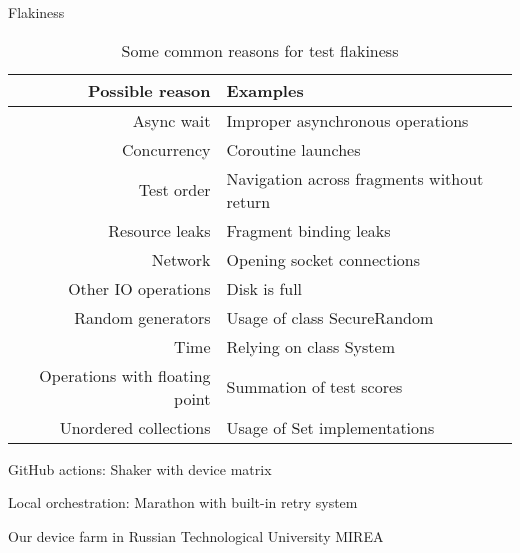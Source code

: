 \documentclass{beamer}%
\begin{document}
\begin{frame}{Flakiness}
\begin{changemargin}
\footnotesize


\begin{table}[h]
\caption{Some common reasons for test flakiness}
\centering\begin{tabular}{rl}
\toprule
Possible reason                & Examples                                   \\
\midrule
Async wait                     & Improper asynchronous operations           \\
Concurrency                    & Coroutine launches                         \\
Test order                     & Navigation across fragments without return \\
Resource leaks                 & Fragment binding leaks                     \\
Network                        & Opening socket connections                 \\
Other IO operations            & Disk is full                               \\
Random generators              & Usage of class SecureRandom                \\
Time                           & Relying on class System                    \\
Operations with floating point & Summation of test scores                   \\
Unordered collections          & Usage of Set implementations               \\
\bottomrule
\end{tabular}
\label{table:flakiness_causes}
\end{table}


GitHub actions: Shaker with device matrix

Local orchestration: Marathon with built-in retry system

Our device farm in Russian Technological University MIREA


\end{changemargin}
\end{frame}
\end{document}
